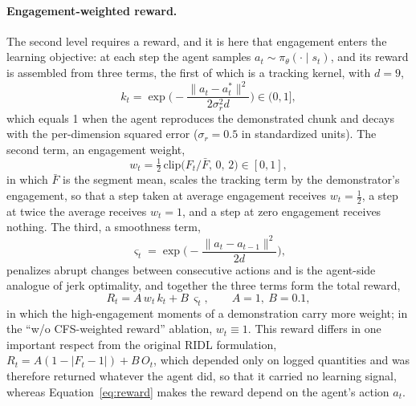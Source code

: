 \documentclass[utf8]{frontiers_suppmat}
\begin{document}
\paragraph*{Engagement-weighted reward.} The second level requires a reward, and it is here that engagement enters the learning objective: at each step the agent samples $a_t\sim\pi_\theta(\cdot\mid s_t)$, and its reward is assembled from three terms, the first of which is a tracking kernel, with $d=9$,
\begin{equation}\label{eq:track}
k_t=\exp\!\Big(-\frac{\|a_t-a^*_t\|^{2}}{2\sigma_r^{2}d}\Big)\in(0,1],
\end{equation}
which equals 1 when the agent reproduces the demonstrated chunk and decays with the per-dimension squared error ($\sigma_r=0.5$ in standardized units). The second term, an engagement weight,
\begin{equation}\label{eq:weight}
w_t=\tfrac12\,\mathrm{clip}\big(F_t/\bar F,\,0,\,2\big)\in[0,1],
\end{equation}
in which $\bar F$ is the segment mean, scales the tracking term by the demonstrator's engagement, so that a step taken at average engagement receives $w_t=\tfrac12$, a step at twice the average receives $w_t=1$, and a step at zero engagement receives nothing. The third, a smoothness term,
\begin{equation}\label{eq:smooth}
\varsigma_t=\exp\!\Big(-\frac{\|a_t-a_{t-1}\|^{2}}{2d}\Big),
\end{equation}
penalizes abrupt changes between consecutive actions and is the agent-side analogue of jerk optimality, and together the three terms form the total reward,
\begin{equation}\label{eq:reward}
R_t=A\,w_t\,k_t+B\,\varsigma_t,\qquad A=1,\ B=0.1 ,
\end{equation}
in which the high-engagement moments of a demonstration carry more weight; in the ``w/o CFS-weighted reward'' ablation, $w_t\equiv1$. This reward differs in one important respect from the original RIDL formulation, $R_t=A(1-|F_t-1|)+B\,O_t$, which depended only on logged quantities and was therefore returned whatever the agent did, so that it carried no learning signal, whereas Equation~\eqref{eq:reward} makes the reward depend on the agent's action $a_t$.
\end{document}
